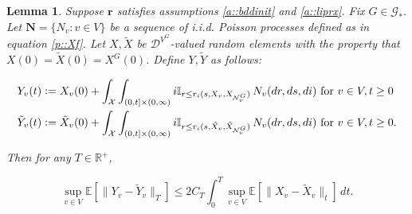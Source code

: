 \documentclass[12pt]{article}
\newcommand{\mb}{\mathbb}
\newcommand{\mc}{\mathcal}
\newcommand{\te}{\text}
\newcommand{\ex}[1]{\mb{E}\left[#1\right]}			%
\newcommand{\defeq}{:=}								%
\newcommand{\cad}{\mc{D}}							%
\newcommand{\sta}{\mc{X}}							%
\newcommand{\gneigh}[2]{\mc{N}^{#1}_{#2}}			%
\newcommand{\Xf}{X}									%
\newcommand{\poiss}{N}								%
\newcommand{\rate}{r}								%
\newcommand{\poisses}{\mathbf{N}}					%
\newcommand{\poissv}[1]{_{#1}}						%
\newcommand{\vind}[1]{_{#1}}						%
\newcommand{\tme}[1]{(#1)}							%
\newcommand{\gind}[1]{^{#1}}						%
\newcommand{\vpara}[1]{^{#1}}						%
\newcommand{\stpara}[1]{_{#1}}						%
\newcommand{\tpara}[1]{_{#1}}						%
\newcommand{\rateset}{\mathbf{\rate}}				%
\newcommand{\jumpbd}[1]{C_{#1}}						%
\newcommand{\Gs}{\mc{G}_\ast}						%
\newcommand{\tmepro}[3]{
\ifstrempty{#3}{
	(#1,#2)}{
	(#1,#2,#3)}}									%
\newcommand{\Xg}{Y}									%
\newcommand{\alt}[1]{\tilde{#1}}					%
\newtheorem{lem}[thms]{Lemma}
\begin{document}
\begin{lem}
Suppose \(\rateset\) satisfies assumptions \ref{a::bddinit} and \ref{a::liprx}. Fix \(G \in \Gs\). Let \(\poisses = \{\poiss\poissv{v}:v \in V\}\) be a sequence of i.i.d. Poisson processes defined as in equation \eqref{p::Xf}. Let \(\Xf,\alt{\Xf}\) be \(\cad\vpara{V\gind{G}}\)-valued random elements with the property that \(\Xf\tme{0} = \alt{\Xf}\tme{0} = \Xf\gind{G}\tme{0}\). Define \(\Xg,\alt{\Xg}\) as follows:

\begin{align*}
\Xg\vind{v}\tme{t} &\defeq \Xf\vind{v}\tme{0} + \int_\sta\int_{(0,t]\times(0,\infty)} i\mb{I}_{r \leq \rate\stpara{i}\tmepro{s}{\Xf\vind{v}}{\Xf\vind{\gneigh{G}{v}}}}\,\poiss\poissv{v}(dr,ds,di) \te{ for } v \in V,t \geq 0\\
\alt{\Xg}\vind{v}\tme{t} &\defeq \alt{\Xf}\vind{v}\tme{0} + \int_\sta\int_{(0,t]\times(0,\infty)} i\mb{I}_{r \leq \rate\stpara{i}\tmepro{s}{\alt{\Xf}\vind{v}}{\alt{\Xf}\vind{\gneigh{G}{v}}}}\,\poiss\poissv{v}(dr,ds,di) \te{ for } v \in V,t \geq 0.\\
\end{align*}

Then for any \(T \in \mb{R}^+\),

\begin{equation}
\sup_{v\in V}\ex{\|\Xg\vind{v} - \alt{\Xg}\vind{v}\|\tpara{T}} \leq 2\jumpbd{T} \int_0^T \sup_{v \in V} \ex{\|\Xf\vind{v} - \alt{\Xf}\vind{v}\|\tpara{t}}\,dt.
\label{wp::Groneqn}
\end{equation}
\label{wp::Gronwall}
\end{lem}
\end{document}
